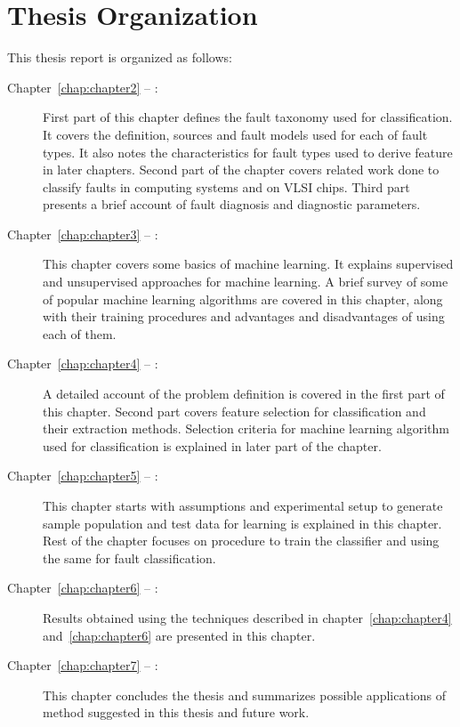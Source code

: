 \section{Thesis Organization}
This thesis report is organized as follows:
\begin{description}
\item[Chapter~\ref{chap:chapter2} -- :] First part of this chapter defines the fault taxonomy used for classification. It covers the definition, sources and fault models used for each of fault types. It also notes the characteristics for fault types used to derive feature in later chapters. Second part of the chapter covers related work done to classify faults in computing systems and on VLSI chips. Third part presents a brief account of fault diagnosis and diagnostic parameters.

\item[Chapter~\ref{chap:chapter3} -- :] This chapter covers some basics of machine learning. It explains supervised and unsupervised approaches for machine learning. A brief survey of some of popular machine learning algorithms are covered in this chapter, along with their training procedures and advantages and disadvantages of using each of them.
 
\item[Chapter~\ref{chap:chapter4} -- :] A detailed account of the problem definition is covered in the first part of this chapter. Second part covers feature selection for classification and their extraction methods. Selection criteria for machine learning algorithm used for classification is explained in later part of the chapter.

\item[Chapter~\ref{chap:chapter5} -- :] This chapter starts with assumptions and experimental setup to generate sample population and test data for learning is explained in this chapter. Rest of the chapter focuses on procedure to train the classifier and using the same for fault classification.

\item[Chapter~\ref{chap:chapter6} -- :] Results obtained using the techniques described in chapter~\ref{chap:chapter4} and~\ref{chap:chapter6} are presented in this chapter.

\item[Chapter~\ref{chap:chapter7} -- :] This chapter concludes the thesis and summarizes possible applications of method suggested in this thesis and future work.
\end{description}
